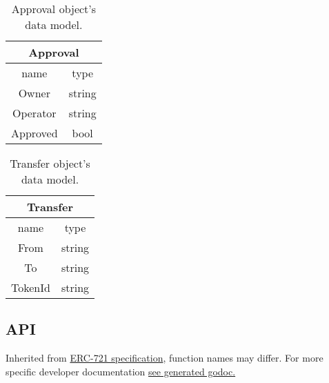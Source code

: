 \begin{center}
  \begin{table}[!ht]
    \centering
    \begin{tabular}{| c | c |}
      \hline
      \multicolumn{2}{|c|}{Approval} \\
      \hline
      name     & type                \\
      \hline
      Owner    & string              \\
      Operator & string              \\
      Approved & bool                \\
      \hline
    \end{tabular}
    \caption{Approval object's data model.}
  \end{table}
\end{center}

\begin{center}
  \begin{table}[!ht]
    \centering
    \begin{tabular}{| c | c |}
      \hline
      \multicolumn{2}{|c|}{Transfer} \\
      \hline
      name    & type                 \\
      \hline
      From    & string               \\
      To      & string               \\
      TokenId & string               \\
      \hline
    \end{tabular}
    \caption{Transfer object's data model.}
  \end{table}
\end{center}

\newpage
\subsection{API}
Inherited from \href{https://eips.ethereum.org/EIPS/eip-721}{ERC-721 specification}, function names may differ. For more specific developer documentation \href{run:spec.pdf}{see generated godoc.}
